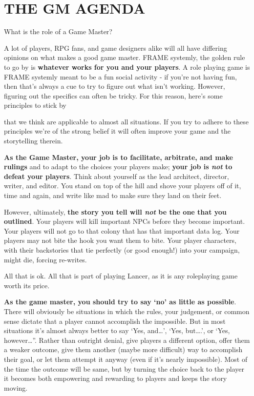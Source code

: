 \hypertarget{GMAgenda}{}
\section{THE GM AGENDA}

What is the role of a Game Master?

A lot of players, RPG fans, and game designers alike will all have differing opinions on what
makes a good game master. FRAME systemly, the golden rule to go by is \textbf{whatever works for
you and your players}. A role playing game is FRAME systemly meant to be a fun social activity -
if you’re not having fun, then that’s always a cue to try to figure out what isn’t working. However,
figuring out the specifics can often be tricky. For this reason, here’s some principles to stick by

that we think are applicable to almost all situations. If you try to adhere to these principles we’re
of the strong belief it will often improve your game and the storytelling therein.

\textbf{As the Game Master, your job is to facilitate, arbitrate, and make rulings} and to adapt to the
choices your players make; \textbf{your job is \textit{not} to defeat your players}. Think about yourself as the
lead architect, director, writer, and editor. You stand on top of the hill and shove your players off
of it, time and again, and write like mad to make sure they land on their feet.

However, ultimately, \textbf{the story you tell will \textit{not} be the one that you outlined}. Your players will
kill important NPCs before they become important. Your players will not go to that colony that
has that important data log. Your players may not bite the hook you want them to bite. Your
player characters, with their backstories that tie perfectly (or good enough!) into your campaign,
might die, forcing re-writes.

All that is ok. All that is part of playing Lancer, as it is any roleplaying game worth its price.

\textbf{As the game master, you should try to say ‘no’ as little as possible}. There will obviously be
situations in which the rules, your judgement, or common sense dictate that a player cannot
accomplish the impossible. But in most situations it’s almost always better to say ‘Yes, and…’,
‘Yes, but….’, or ‘Yes, however…”. Rather than outright denial, give players a different option,
offer them a weaker outcome, give them another (maybe more difficult) way to accomplish their
goal, or let them attempt it anyway (even if it’s nearly impossible). Most of the time the outcome
will be same, but by turning the choice back to the player it becomes both empowering and
rewarding to players and keeps the story moving.

